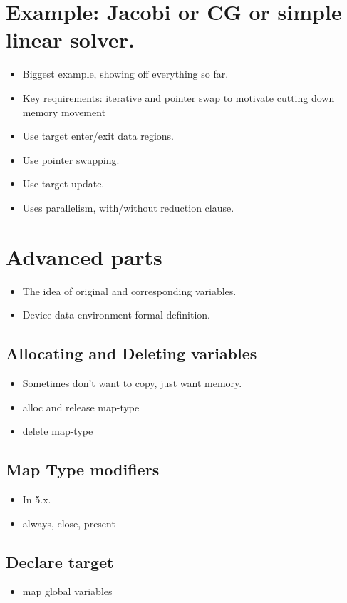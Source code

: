 \section{Example: Jacobi or CG or simple linear solver.}
\begin{itemize}
  \item Biggest example, showing off everything so far.
  \item Key requirements: iterative and pointer swap to motivate cutting down memory movement
  \item Use target enter/exit data regions.
  \item Use pointer swapping.
  \item Use target update.
  \item Uses parallelism, with/without reduction clause.
\end{itemize}


\section{Advanced parts}

\begin{itemize}
  \item The idea of original and corresponding variables.
  \item Device data environment formal definition.
\end{itemize}

\subsection{Allocating and Deleting variables}
\begin{itemize}
  \item Sometimes don't want to copy, just want memory.
  \item alloc and release map-type
  \item delete map-type
\end{itemize}

\subsection{Map Type modifiers}
\begin{itemize}
  \item In 5.x.
  \item always, close, present
\end{itemize}

\subsection{Declare target}
\label{ssec:declare_target}
\begin{itemize}
  \item map global variables
\end{itemize}


